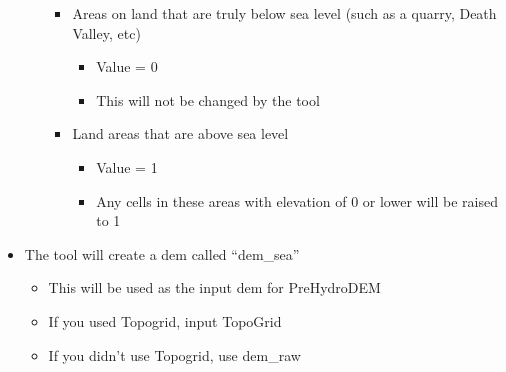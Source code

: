 \documentclass[letterpaper,10pt,english]{sphinxmanual}
\begin{document}
\begin{itemize}
\begin{itemize}
\begin{itemize}
\item {} 
Areas on land that are truly below sea level (such as a quarry, Death Valley, etc)
\begin{itemize}
\item {} 
Value = 0

\item {} 
This will not be changed by the tool

\end{itemize}

\item {} 
Land areas that are above sea level
\begin{itemize}
\item {} 
Value = 1

\item {} 
Any cells in these areas with elevation of 0 or lower will be raised to 1

\end{itemize}

\end{itemize}

\end{itemize}

\item {} 
The tool will create a dem called “dem\_sea”
\begin{itemize}
\item {} 
This will be used as the input dem for PreHydroDEM

\item {} 
If you used Topogrid, input TopoGrid

\item {} 
If you didn’t use Topogrid, use dem\_raw

\end{itemize}

\end{itemize}
\end{document}
